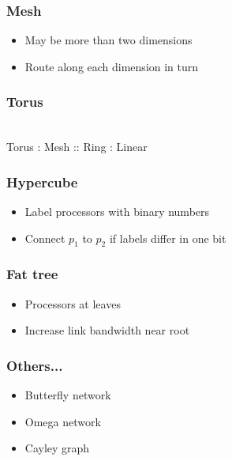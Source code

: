 \documentclass{beamer}
\begin{document}
\begin{frame}
  \frametitle{Mesh}

  \begin{center}
  
  \end{center}
  \begin{itemize}
  \item May be more than two dimensions
  \item Route along each dimension in turn
  \end{itemize}
\end{frame}


\begin{frame}
  \frametitle{Torus}

  \begin{center}
     \\
    Torus : Mesh :: Ring : Linear
  \end{center}
\end{frame}


\begin{frame}
  \frametitle{Hypercube}
  \begin{center}
  
  \end{center}
  \begin{itemize}
  \item Label processors with binary numbers
  \item Connect $p_1$ to $p_2$ if labels differ in one bit
  \end{itemize}
\end{frame}


\begin{frame}
  \frametitle{Fat tree}
  \begin{center}
  
  \end{center}
  \begin{itemize}
  \item Processors at leaves
  \item Increase link bandwidth near root
  \end{itemize}
\end{frame}


\begin{frame}
  \frametitle{Others...}

  \begin{itemize}
  \item Butterfly network
  \item Omega network
  \item Cayley graph
  \end{itemize}
\end{frame}
\end{document}
